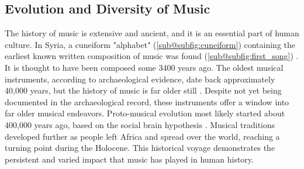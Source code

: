 \subsection{Evolution and Diversity of Music}
\begin{figure}[!ht]
    \centering
    \qquad
\end{figure}
The history of music is extensive and ancient, and it is an essential part of human culture. 
In Syria, a cuneiform "alphabet" (\ref{sub@subfig:cuneiform}) containing the earliest known written composition of music was found (\ref{sub@subfig:first_song}) \citep{porter_2018_did}.
It is thought to have been composed some 3400 years ago. 
The oldest musical instruments, according to archaeological evidence, date back approximately 40,000 years, but the history of music is far older still \citep{killin_2018_the}.
Despite not yet being documented in the archaeological record, these instruments offer a window into far older musical endeavors. 
Proto-musical evolution most likely started about 400,000 years ago, based on the social brain hypothesis \citep{dunbar_social_brain}. 
Musical traditions developed further as people left Africa and spread over the world, reaching a turning point during the Holocene. 
This historical voyage demonstrates the persistent and varied impact that music has played in human history.
